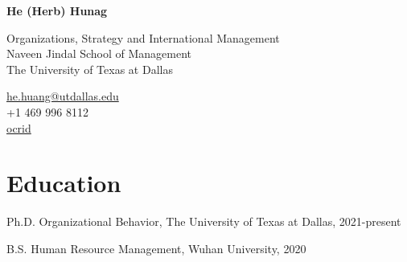 \documentclass[11pt,letterpaper]{report} %
\newcommand{\myname}{He (Herb) Hunag}
\newcommand{\namefont}[1]{{\normalfont\bfseries\Huge{#1}}}
\begin{document}
    \raggedright{}

    \namefont{\myname}

    \vspace{1em}
    \begin{minipage}[t]{0.700\textwidth}
        Organizations, Strategy and International Management \\
        Naveen Jindal School of Management \\
        The University of Texas at Dallas
    \end{minipage}
    \begin{minipage}[t]{0.295\textwidth}
        \flushright{}
        \href{mailto:he.huang@utdallas.edu}{he.huang@utdallas.edu} \\
        +1 469 996 8112 \\
        \href{https://orcid.org/0000-0001-5915-5988}{ocrid}
    \end{minipage}


    \section*{Education}

    \begin{tablist}

        \item[Ph.D.] \tab{}Organizational Behavior, The University of Texas at Dallas, 2021-present
        \item[B.S.]  \tab{}Human Resource Management, Wuhan University, 2020

    \end{tablist}





\end{document}
